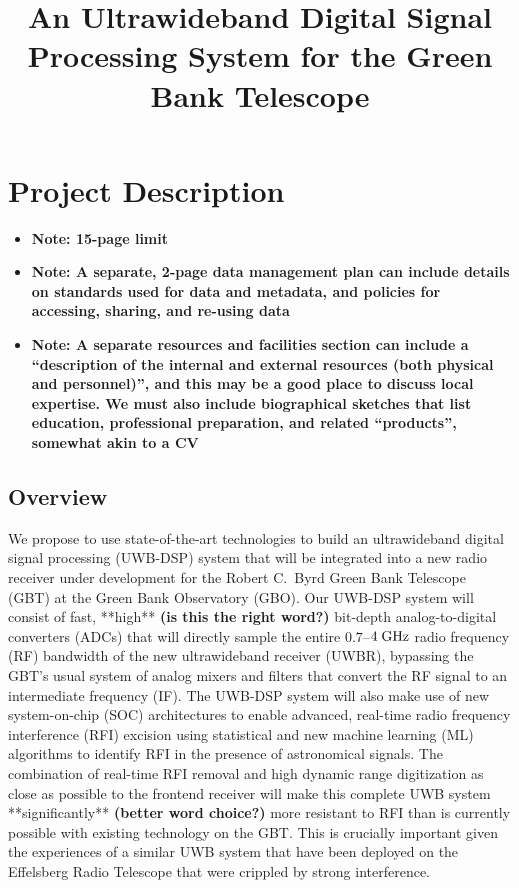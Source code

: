 \documentclass[10pt]{myNSF}
\begin{document}
\title{An Ultrawideband Digital Signal Processing System for the Green
  Bank Telescope}
\maketitle

\section{Project Description}
\label{sec:project_description}

\begin{itemize}
\item{\textbf{Note: 15-page limit}}
\item{\textbf{Note: A separate, 2-page data management plan can
      include details on standards used for data and metadata, and
      policies for accessing, sharing, and re-using data}}
\item{\textbf{Note: A separate resources and facilities section can
      include a ``description of the internal and external resources
      (both physical and personnel)'', and this may be a good place to
      discuss local expertise.  We must also include biographical
      sketches that list education, professional preparation, and
      related ``products'', somewhat akin to a CV}}
\end{itemize}

\subsection{Overview}
\label{sec:overview}

We propose to use state-of-the-art technologies to build an
ultrawideband digital signal processing (UWB-DSP) system that will be
integrated into a new radio receiver under development for the Robert
C.\ Byrd Green Bank Telescope (GBT) at the Green Bank Observatory
(GBO).  Our UWB-DSP system will consist of fast, **high** \textbf{(is
  this the right word?)} bit-depth analog-to-digital converters (ADCs)
that will directly sample the entire $0.7$--$4\; \textrm{GHz}$ radio frequency
(RF) bandwidth of the new ultrawideband receiver (UWBR), bypassing the
GBT's usual system of analog mixers and filters that convert the RF
signal to an intermediate frequency (IF).  The UWB-DSP system will
also make use of new system-on-chip (SOC) architectures to enable
advanced, real-time radio frequency interference (RFI) excision using
statistical and new machine learning (ML) algorithms to identify RFI
in the presence of astronomical signals.  The combination of real-time
RFI removal and high dynamic range digitization as close as possible
to the frontend receiver will make this complete UWB system
**significantly** \textbf{(better word choice?)} more resistant to RFI
than is currently possible with existing technology on the GBT.  This
is crucially important given the experiences of a similar UWB system
that have been deployed on the Effelsberg Radio Telescope that were
crippled by strong interference.
\end{document}
